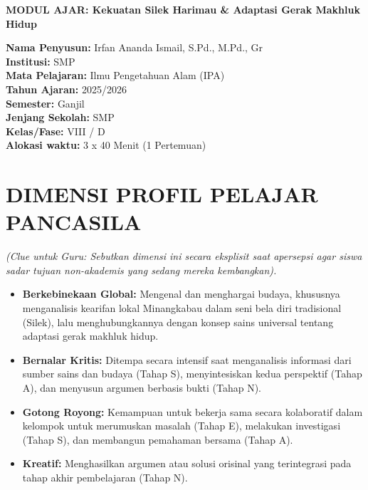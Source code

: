 \documentclass[a4paper,12pt]{article}
\begin{document}
\begin{center}
{\Large\textbf{MODUL AJAR: Kekuatan Silek Harimau \& Adaptasi Gerak Makhluk Hidup}}
\end{center}

\vspace{0.5cm}

\begin{tcolorbox}[mainbox]
\textbf{Nama Penyusun:} Irfan Ananda Ismail, S.Pd., M.Pd., Gr \\
\textbf{Institusi:} SMP \\
\textbf{Mata Pelajaran:} Ilmu Pengetahuan Alam (IPA) \\
\textbf{Tahun Ajaran:} 2025/2026 \\
\textbf{Semester:} Ganjil \\
\textbf{Jenjang Sekolah:} SMP \\
\textbf{Kelas/Fase:} VIII / D \\
\textbf{Alokasi waktu:} 3 x 40 Menit (1 Pertemuan)
\end{tcolorbox}

\section{DIMENSI PROFIL PELAJAR PANCASILA}
\textit{(Clue untuk Guru: Sebutkan dimensi ini secara eksplisit saat apersepsi agar siswa sadar tujuan non-akademis yang sedang mereka kembangkan).}

\begin{itemize}
\item \textbf{Berkebinekaan Global:} Mengenal dan menghargai budaya, khususnya menganalisis kearifan lokal Minangkabau dalam seni bela diri tradisional (Silek), lalu menghubungkannya dengan konsep sains universal tentang adaptasi gerak makhluk hidup.
\item \textbf{Bernalar Kritis:} Ditempa secara intensif saat menganalisis informasi dari sumber sains dan budaya (Tahap S), menyintesiskan kedua perspektif (Tahap A), dan menyusun argumen berbasis bukti (Tahap N).
\item \textbf{Gotong Royong:} Kemampuan untuk bekerja sama secara kolaboratif dalam kelompok untuk merumuskan masalah (Tahap E), melakukan investigasi (Tahap S), dan membangun pemahaman bersama (Tahap A).
\item \textbf{Kreatif:} Menghasilkan argumen atau solusi orisinal yang terintegrasi pada tahap akhir pembelajaran (Tahap N).
\end{itemize}
\end{document}

